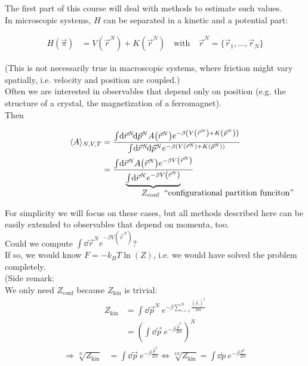 The first part of this course will deal with methods to estimate such values.\\
In microscopic systems, $H$ can be separated in a kinetic and a potential part:

\begin{align}
	H(\vec{\pi}) &= V(\vec{r}^N) + K(\vec{r}^N) \quad\text{with}\quad \vec{r}^N = \{\vec{r}_1,\dots,\vec{r}_N\}
\end{align}

(This is not necessarily true in macroscopic systems, where friction might vary spatially, i.e. velocity and position are coupled.)\\

Often we are interested in observables that depend only on position (e.g. the structure of a crystal, the magnetization of a ferromagnet).\\
Then

\begin{align}
	\langle A \rangle_{N, V, T} &= \frac{\int\dd\vec{r}^N\dd\vec{p}^N A\left(\vec{r}^N\right) e^{-\beta\left(V\left(\vec{r}^N\right) + K\left(\vec{p}^N\right)\right)}}{\int\dd\vec{r}^N\dd\vec{p}^N e^{-\beta\left(V\left(\vec{r}^N\right) + K\left(\vec{p}^N\right)\right)}}\\
	&= \frac{\int\dd\vec{r}^N A\left(\vec{r}^N\right) e^{-\beta V\left(\vec{r}^N\right)}}{\underbrace{\textstyle\int\dd\vec{r}^N e^{-\beta V\left(\vec{r}^N\right)}}_{\parbox{1cm}{$Z_\text{conf}\ \text{ ``configurational partition funciton''}$}}}
\end{align}

For simplicity we will focus on these cases, but all methods described here can be easily extended to observables that depend on momenta, too.\\
Could we compute $\int\dd\vec{r}^N e^{-\beta V\left(\vec{r}^N\right)}$?\\
If so, we would know $F = -k_B T \ln(Z)$, i.e. we would have solved the problem completely.\\

(Side remark:\\
We only need $Z_\text{conf}$ because $Z_\text{kin}$ is trivial:
\begin{align}
	Z_\text{kin} &= \int\dd\vec{p}^N\ e^{-\beta\sum\limits_{i=1}^{N}\frac{\left(\vec{p}_i\right)^2}{2m}}\\
	&= \left(\int\dd\vec{p}\ e^{-\beta\frac{\vec{p}^2}{2m}}\right)^N
\end{align}
\begin{align}
	\Rightarrow \sqrt[N]{Z_\text{kin}} &=  \int\dd\vec{p}\ e^{-\beta\frac{\vec{p}^2}{2m}} \Leftrightarrow\sqrt[3N]{Z_\text{kin}} = \int\dd p\ e^{-\beta\frac{p^2}{2m}}
\end{align}

